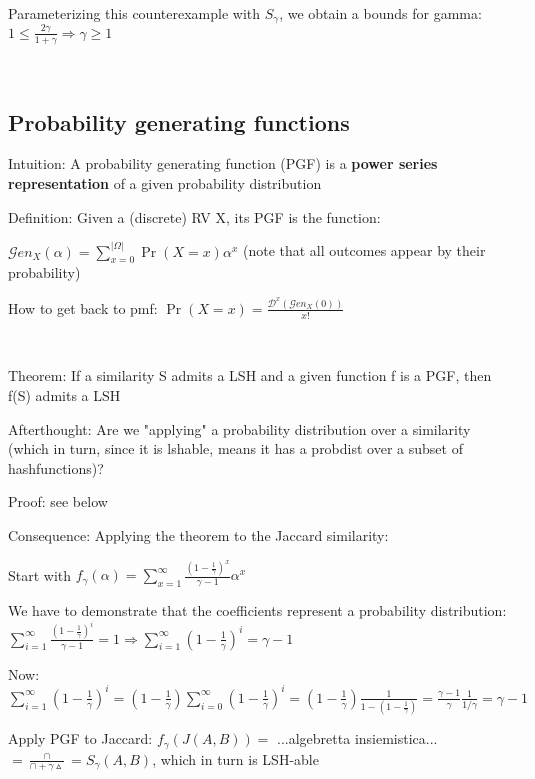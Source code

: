 \documentclass{report}
\begin{document}
	Parameterizing this counterexample with $S_\gamma$, we obtain a bounds for gamma: $1 \leq \frac{2\gamma}{1 + \gamma} \Rightarrow \gamma \geq 1$
	
	\
	
	\subsection{Probability generating functions}
	
	Intuition: A probability generating function (PGF) is a \textbf{power series representation} of a given probability distribution
	
	Definition: Given a (discrete) RV X, its PGF is the function:
	
	$\displaystyle \mathcal{G}en_X(\alpha)= \sum_{x=0}^{|\Omega|}\Pr(X=x)\alpha^x$ (note that all outcomes appear by their probability)
	
	How to get back to pmf: $\displaystyle \Pr(X=x) = \frac{\mathcal{D}^x(\mathcal{G}en_X(0))}{x!}$
	
	\
	
	Theorem: If a similarity S admits a LSH and a given function f is a PGF, then f(S) admits a LSH
	
	Afterthought: Are we "applying" a probability distribution over a similarity (which in turn, since it is lshable, means it has a probdist over a subset of hashfunctions)?
	
	Proof: see below
	
	Consequence: Applying the theorem to the Jaccard similarity:
	
	
	Start with $\displaystyle f_\gamma(\alpha) = \sum_{x=1}^{\infty}\frac{(1-\frac{1}{\gamma})^x}{\gamma -1}\alpha^x$
	
	We have to demonstrate that the coefficients represent a probability distribution: $\displaystyle \sum_{i=1}^{\infty}\frac{(1-\frac{1}{\gamma})^i}{\gamma -1}=1 \Rightarrow \sum_{i=1}^{\infty}(1-\frac{1}{\gamma})^i=\gamma -1$
	
	Now: $\displaystyle \sum_{i=1}^{\infty}(1 - \frac{1}{\gamma})^i = (1 - \frac{1}{\gamma})\sum_{i=0}^{\infty}(1 - \frac{1}{\gamma})^i = (1 - \frac{1}{\gamma}) \frac{1}{1 - (1 - \frac{1}{\gamma})} = \frac{\gamma -1 }{\gamma}\frac{1}{1/\gamma} = \gamma -1$
	
	
	Apply PGF to Jaccard: $f_\gamma (J(A, B)) = $ ...algebretta insiemistica... $= \frac{\cap}{\cap + \gamma\vartriangle} = S_\gamma(A, B)$, which in turn is LSH-able
	
\end{document}
